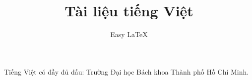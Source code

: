 \documentclass{article}
\title{Tài liệu tiếng Việt}
\author{Easy LaTeX}
\begin{document}
\maketitle
Tiếng Việt có đầy đủ dấu: Trường Đại học Bách khoa Thành phố Hồ Chí Minh.
\end{document}
